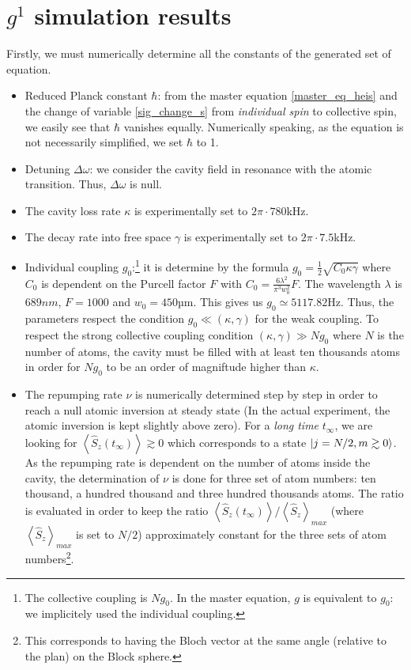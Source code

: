 \documentclass[11pt]{report}
\DeclarePairedDelimiter\ket{\lvert}{\rangle}
\begin{document}
\section{$g^1$ simulation results}

Firstly, we must  numerically determine all the constants of the generated set of equation.

\begin{itemize}
	\item Reduced Planck constant $\hbar$: from the master equation \ref{master_eq_heis} and the change of variable \ref{sig_change_s} from \textit{individual spin} to collective spin, we easily see that $\hbar$ vanishes equally. Numerically speaking, as the equation is not necessarily simplified, we set $\hbar$ to 1.
	\item Detuning $\Delta\omega$: we consider the cavity field in resonance with the atomic transition. Thus, $\Delta\omega$ is null.
	\item The cavity loss rate $\kappa$ is experimentally set to $2\pi \cdot 780$kHz.
	\item The decay rate into free space $\gamma$ is experimentally set to $2\pi \cdot 7.5$kHz.
	\item Individual coupling $g_0$:\footnote{The collective coupling is $Ng_0$. In the master equation, $g$ is equivalent to $g_0$: we implicitely used the individual coupling.} it is determine by the formula $g_0=\frac{1}{2}\sqrt{C_0\kappa\gamma}$ where $C_0$ is dependent on the Purcell factor $F$ with $C_0=\frac{6\lambda^2}{\pi^3w_0^2}F$. The wavelength $\lambda$ is $689nm$, $F=1000$ and $w_0=450$µm. This gives us $g_0\simeq5117.82$Hz. Thus, the parameters respect the condition $g_0\ll(\kappa, \gamma)$ for the weak coupling. To respect the strong collective coupling condition $(\kappa, \gamma) \gg Ng_0$ where $N$ is the number of atoms, the cavity must be filled with at least ten thousands atoms in order for $Ng_0$ to be an order of magniftude higher than $\kappa$.
	\item The repumping rate $\nu$ is numerically determined step by step in order to reach a null atomic inversion at steady state (In the actual experiment, the atomic inversion is kept slightly above zero). For a \textit{long time} $t_\infty$, we are looking for $\left\langle \hat{S}_z(t_\infty) \right\rangle \gtrsim 0$ which corresponds to a state $\ket{j=N/2, m \gtrsim 0}$. As the repumping rate is dependent on the number of atoms inside the cavity, the determination of $\nu$ is done for three set of atom numbers: ten thousand, a hundred thousand and three hundred thousands atoms. The ratio is evaluated in order to keep the ratio $\left\langle \hat{S}_z(t_\infty) \right\rangle / \left\langle \hat{S}_z \right\rangle _{max}$ (where $\left\langle \hat{S}_z \right\rangle _{max}$ is set to $N/2$) approximately constant for the three sets of atom numbers\footnote{This corresponds to having the Bloch vector at the same angle (relative to the plan) on the Block sphere.}.
\end{itemize}
\end{document}
